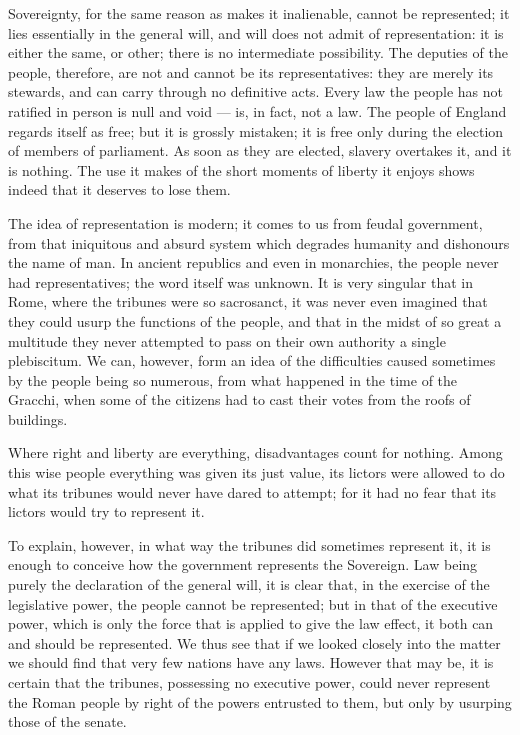 \documentclass[12pt]{book}
\begin{document}
Sovereignty, for the same reason as makes it inalienable, cannot be represented; it lies essentially in the general will, and will does not admit of representation: it is either the same, or other; there is no intermediate possibility. The deputies of the people, therefore, are not and cannot be its representatives: they are merely its stewards, and can carry through no definitive acts. Every law the people has not ratified in person is null and void — is, in fact, not a law. The people of England regards itself as free; but it is grossly mistaken; it is free only during the election of members of parliament. As soon as they are elected, slavery overtakes it, and it is nothing. The use it makes of the short moments of liberty it enjoys shows indeed that it deserves to lose them.

The idea of representation is modern; it comes to us from feudal government, from that iniquitous and absurd system which degrades humanity and dishonours the name of man. In ancient republics and even in monarchies, the people never had representatives; the word itself was unknown. It is very singular that in Rome, where the tribunes were so sacrosanct, it was never even imagined that they could usurp the functions of the people, and that in the midst of so great a multitude they never attempted to pass on their own authority a single plebiscitum. We can, however, form an idea of the difficulties caused sometimes by the people being so numerous, from what happened in the time of the Gracchi, when some of the citizens had to cast their votes from the roofs of buildings.

Where right and liberty are everything, disadvantages count for nothing. Among this wise people everything was given its just value, its lictors were allowed to do what its tribunes would never have dared to attempt; for it had no fear that its lictors would try to represent it.

To explain, however, in what way the tribunes did sometimes represent it, it is enough to conceive how the government represents the Sovereign. Law being purely the declaration of the general will, it is clear that, in the exercise of the legislative power, the people cannot be represented; but in that of the executive power, which is only the force that is applied to give the law effect, it both can and should be represented. We thus see that if we looked closely into the matter we should find that very few nations have any laws. However that may be, it is certain that the tribunes, possessing no executive power, could never represent the Roman people by right of the powers entrusted to them, but only by usurping those of the senate.
\end{document}
